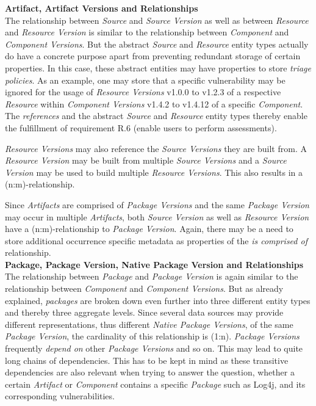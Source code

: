 \noindent\textbf{Artifact, Artifact Versions and Relationships}\\
The relationship between \emph{Source} and \emph{Source Version} as well as between \emph{Resource} and \emph{Resource Version} is similar to the relationship between \emph{Component} and \emph{Component Versions}. But the abstract \emph{Source} and \emph{Resource} entity types actually do have a concrete purpose apart from preventing redundant storage of certain properties. In this case, these abstract entities may have properties to store \emph{triage policies}. As an example, one may store that a specific vulnerability may be ignored for the usage of \emph{Resource Versions} v1.0.0 to v1.2.3 of a respective \emph{Resource} within \emph{Component Versions} v1.4.2 to v1.4.12 of a specific \emph{Component}. The \emph{references} and the abstract \emph{Source} and \emph{Resource} entity types thereby enable the fulfillment of requirement R.6 (enable users to perform assessments).\par 
\emph{Resource Versions} may also reference the \emph{Source Versions} they are built from. A \emph{Resource Version} may be built from multiple \emph{Source Versions} and a \emph{Source Version} may be used to build multiple \emph{Resource Versions}. This also results in a (n:m)-relationship.\par
Since \emph{Artifacts} are comprised of \emph{Package Versions} and the same \emph{Package Version} may occur in multiple \emph{Artifacts}, both \emph{Source Version} as well as \emph{Resource Version} have a (n:m)-relationship to \emph{Package Version}. Again, there may be a need to store additional occurrence specific metadata as properties of the \emph{is comprised of} relationship.\\

\noindent\textbf{Package, Package Version, Native Package Version and Relationships}\\
The relationship between \emph{Package} and \emph{Package Version} is again similar to the relationship between \emph{Component} and \emph{Component Versions}. But as already explained, \emph{packages} are broken down even further into three different entity types and thereby three aggregate levels. Since several data sources may provide different representations, thus different \emph{Native Package Versions}, of the same \emph{Package Version}, the cardinality of this relationship is (1:n). \emph{Package Versions} frequently \emph{depend on} other \emph{Package Versions} and so on. This may lead to quite long chains of dependencies. This has to be kept in mind as these transitive dependencies are also relevant when trying to answer the question, whether a certain \emph{Artifact} or \emph{Component} contains a specific \emph{Package} such as Log4j, and its corresponding vulnerabilities.\\

